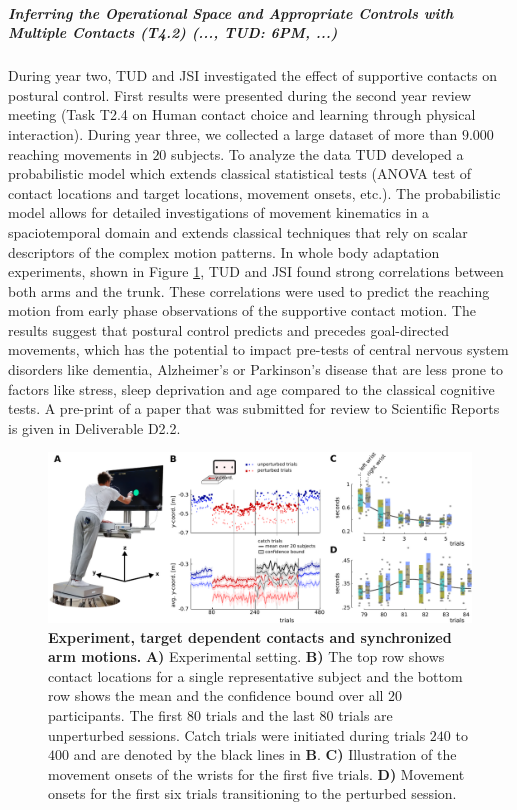 \subparagraph{Inferring the Operational Space and Appropriate Controls with Multiple Contacts (T4.2) (..., TUD: 6PM, ...)}%


During year two, TUD and JSI investigated the effect of supportive contacts on 
postural control. First results were presented during the second year review 
meeting (Task T2.4 on Human contact choice and learning through physical 
interaction). During year three, we collected a large dataset of more than 
$9.000$ reaching movements in $20$ subjects. To analyze the data TUD developed a 
probabilistic model which extends classical statistical tests (ANOVA test of 
contact locations and target locations, movement onsets, etc.). The 
probabilistic model allows for detailed investigations of movement kinematics in 
a spaciotemporal domain and extends classical techniques that rely on scalar 
descriptors of the complex motion patterns. In whole body adaptation 
experiments, shown in Figure \ref{fig:subFigContactLocationsAllSubjects}, TUD 
and JSI found strong correlations between both arms and the trunk. These 
correlations were used to predict the reaching motion from early phase 
observations of the supportive contact motion. The results suggest that postural 
control predicts and precedes goal-directed movements, which has the potential 
to impact pre-tests of central nervous system disorders like dementia, 
Alzheimer's or Parkinson's disease that are less prone to factors like stress, 
sleep deprivation and age compared to the classical cognitive tests. A pre-print 
of a paper that was submitted for review to Scientific Reports is given in 
Deliverable D2.2.

\begin{figure}%
\centering
\includegraphics[width=\textwidth]{images/Figure-1(rueckert)}
 \caption[Human reaching experiment with target dependent contacts and synchronized arm motions.]{\textbf{Experiment, target dependent contacts and synchronized arm motions.} \textbf{A)} Experimental setting. 
 \textbf{B)}  The top row shows contact locations for a single representative subject 
 and the bottom row shows the mean and the confidence bound over all $20$ participants. 
 The first $80$ trials and the last $80$ trials are unperturbed sessions. 
 Catch trials were initiated during trials $240$ to $400$ and are denoted by the black lines in \textbf{B}.
 \textbf{C)} Illustration of the movement onsets of the wrists for the first five trials. 
 \textbf{D)} Movement onsets for the first six trials transitioning to the perturbed session. 
}
\label{fig:subFigContactLocationsAllSubjects}
\end{figure}

